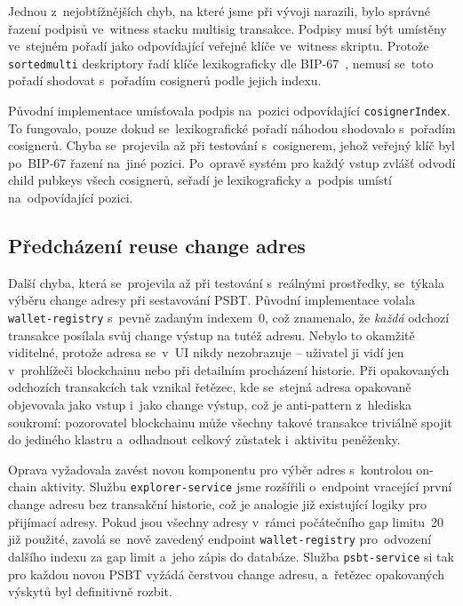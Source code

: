 Jednou z~nejobtížnějších chyb, na které jsme při vývoji narazili, bylo
správné řazení podpisů ve~witness stacku multisig transakce. Podpisy
musí být umístěny ve~stejném pořadí jako odpovídající veřejné klíče
ve~witness skriptu. Protože \texttt{sortedmulti} deskriptory řadí klíče
lexikograficky dle BIP-67~\cite{BIP67}, nemusí se~toto pořadí shodovat
s~pořadím cosignerů podle jejich indexu.

Původní implementace umísťovala podpis na~pozici odpovídající
\texttt{cosigner\-Index}. To fungovalo, pouze dokud se~lexikografické
pořadí náhodou shodovalo s~pořadím cosignerů. Chyba se~projevila
až při testování s~cosignerem, jehož veřejný klíč byl po~BIP-67 řazení
na~jiné pozici. Po~opravě systém pro každý vstup zvlášť odvodí child
pubkeys všech cosignerů, seřadí je lexikograficky a~podpis umístí
na~odpovídající pozici.

\subsection{Předcházení reuse change adres}

Další chyba, která se~projevila až při testování s~reálnými prostředky,
se~týkala výběru change adresy při sestavování PSBT. Původní implementace
volala \texttt{wallet-registry} s~pevně zadaným indexem~0, což znamenalo,
že \emph{každá} odchozí transakce posílala svůj change výstup na tutéž
adresu. Nebylo to okamžitě viditelné, protože adresa se~v~UI nikdy
nezobrazuje -- uživatel ji vidí jen v~prohlížeči blockchainu nebo při
detailním procházení historie. Při opakovaných odchozích transakcích
tak vznikal řetězec, kde se~stejná adresa opakovaně objevovala jako
vstup i~jako change výstup, což je anti-pattern z~hlediska soukromí:
pozorovatel blockchainu může všechny takové transakce triviálně spojit
do jediného klastru a~odhadnout celkový zůstatek i~aktivitu peněženky.

Oprava vyžadovala zavést novou komponentu pro výběr adres s~kontrolou
on-chain aktivity. Službu \texttt{explorer-service} jsme rozšířili
o~endpoint vracející první change adresu bez transakční historie, což
je analogie již existující logiky pro přijímací adresy. Pokud jsou
všechny adresy v~rámci počátečního gap limitu~20 již použité, zavolá
se~nově zavedený endpoint \texttt{wallet-registry} pro~odvození dalšího
indexu za gap limit a~jeho zápis do databáze. Služba \texttt{psbt-service}
si tak pro každou novou PSBT vyžádá čerstvou change adresu, a~řetězec
opakovaných výskytů byl definitivně rozbit.

